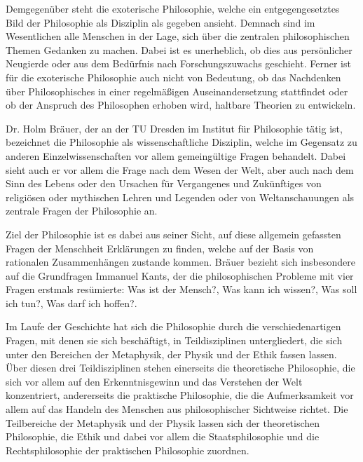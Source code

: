 Demgegenüber steht die exoterische Philosophie, welche ein entgegengesetztes Bild der Philosophie als Disziplin als gegeben ansieht. 
Demnach sind im Wesentlichen alle Menschen in der Lage, sich über die zentralen philosophischen Themen Gedanken zu machen. 
Dabei ist es unerheblich, ob dies aus persönlicher Neugierde oder aus dem Bedürfnis nach Forschungszuwachs geschieht. 
Ferner ist für die exoterische Philosophie auch nicht von Bedeutung, ob das Nachdenken über Philosophisches in einer regelmäßigen Auseinandersetzung stattfindet oder ob der Anspruch des Philosophen erhoben wird, haltbare Theorien zu entwickeln\cite[S.\,8]{BB10}.

Dr. Holm Bräuer, der an der TU Dresden im Institut für Philosophie tätig ist, bezeichnet die Philosophie als wissenschaftliche Disziplin, welche im Gegensatz zu anderen Einzelwissenschaften vor allem gemeingültige Fragen behandelt.
 Dabei sieht auch er vor allem die Frage nach dem Wesen der Welt, aber auch nach dem Sinn des Lebens oder den Ursachen für \glqq Vergangenes und Zukünftiges von religiösen oder mythischen Lehren und Legenden oder von Weltanschauungen\grqq{}\cite{PL16} als zentrale Fragen der Philosophie an.

 Ziel der Philosophie ist es dabei aus seiner Sicht, auf diese allgemein gefassten Fragen der Menschheit Erklärungen zu finden, welche auf der Basis von rationalen Zusammenhängen zustande kommen.
  Bräuer bezieht sich insbesondere auf die Grundfragen Immanuel Kants, der die philosophischen Probleme mit vier Fragen erstmals resümierte: \glqq Was ist der Mensch?\grqq{}, \glqq Was kann ich wissen?\grqq{}, \glqq Was soll ich tun?\grqq{}, \glqq Was darf ich hoffen?\grqq{}.  
  
Im Laufe der Geschichte hat sich die Philosophie durch die verschiedenartigen Fragen, mit denen sie sich beschäftigt, in Teildisziplinen untergliedert, die sich unter den Bereichen der Metaphysik, der Physik und der Ethik fassen lassen. 
Über diesen drei Teildisziplinen stehen einerseits die theoretische Philosophie, die sich vor allem auf den Erkenntnisgewinn und das Verstehen der Welt konzentriert, andererseits die praktische Philosophie, die die Aufmerksamkeit vor allem auf das Handeln des Menschen aus philosophischer Sichtweise richtet. 
Die Teilbereiche der Metaphysik und der Physik lassen sich der theoretischen Philosophie, die Ethik und dabei vor allem die Staatsphilosophie und die Rechtsphilosophie der praktischen Philosophie zuordnen. 

